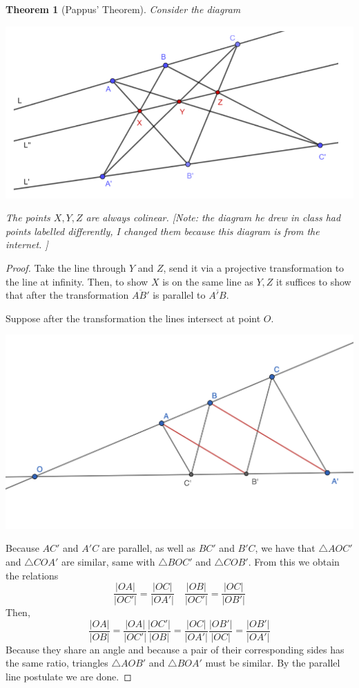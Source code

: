 \documentclass[12pt]{article}
\newtheorem{theorem}{Theorem}[section]
\begin{document}
    \begin{theorem}
        [Pappus' Theorem] Consider the diagram
        \begin{center}
            \includegraphics[width = 0.7\linewidth]{pappus.png}
        \end{center}
        The points $X, Y, Z$ are always colinear. [Note: the diagram he drew in class had points labelled differently, I changed them because this diagram is from the internet. ]
    \end{theorem}
    \begin{proof}
        Take the line through $Y$ and $Z$, send it via a projective transformation to the line at infinity. Then, to show $X$ is on the same line as $Y, Z$ it suffices to show that after the transformation $\overline{AB'}$ is parallel to $\overline{A'B}$.\par
        Suppose after the transformation the lines intersect at point $O$.
        \begin{center}
            \includegraphics[width = 0.8\linewidth]{pappus_case_2.png}
        \end{center}
        Because $AC'$ and $A'C$ are parallel, as well as $BC'$ and $B'C$, we have that $\triangle AOC'$ and $\triangle COA'$ are similar, same with $\triangle BOC'$ and $\triangle COB'$. From this we obtain the relations
        $$\frac{|OA|}{|OC'|} = \frac{|OC|}{|OA'|} \quad \frac{|OB|}{|OC'|} = \frac{|OC|}{|OB'|}$$
        Then,
        $$\frac{|OA|}{|OB|} = \frac{|OA|}{|OC'|}\frac{|OC'|}{|OB|} = \frac{|OC|}{|OA'|}\frac{|OB'|}{|OC|} = \frac{|OB'|}{|OA'|}$$
        Because they share an angle and because a pair of their corresponding sides has the same ratio, triangles $\triangle AOB'$ and $\triangle BOA'$ must be similar. By the parallel line postulate we are done.
    \end{proof}
\end{document}
